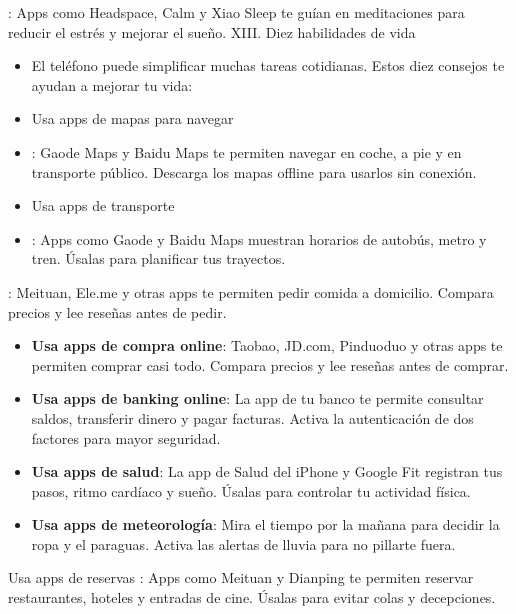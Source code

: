 \begin{tcbpractice}{: Apps como Headspace, Calm y Xiao Sleep te guían en meditaciones para reducir el estrés y mejorar el sueño.}
XIII. Diez habilidades de vida

\begin{itemize}
  \item El teléfono puede simplificar muchas tareas cotidianas. Estos diez consejos te ayudan a mejorar tu vida:
  \item Usa apps de mapas para navegar
  \item : Gaode Maps y Baidu Maps te permiten navegar en coche, a pie y en transporte público. Descarga los mapas offline para usarlos sin conexión.
  \item Usa apps de transporte
  \item : Apps como Gaode y Baidu Maps muestran horarios de autobús, metro y tren. Úsalas para planificar tus trayectos.
\end{itemize}

\end{tcbpractice}


: Meituan, Ele.me y otras apps te permiten pedir comida a domicilio. Compara precios y lee reseñas antes de pedir.

\begin{itemize}
  \item \textbf{Usa apps de compra online}: Taobao, JD.com, Pinduoduo y otras apps te permiten comprar casi todo. Compara precios y lee reseñas antes de comprar.
  \item \textbf{Usa apps de banking online}: La app de tu banco te permite consultar saldos, transferir dinero y pagar facturas. Activa la autenticación de dos factores para mayor seguridad.
  \item \textbf{Usa apps de salud}: La app de Salud del iPhone y Google Fit registran tus pasos, ritmo cardíaco y sueño. Úsalas para controlar tu actividad física.
  \item \textbf{Usa apps de meteorología}: Mira el tiempo por la mañana para decidir la ropa y el paraguas. Activa las alertas de lluvia para no pillarte fuera.
\end{itemize}

\begin{tcbinfo}{Usa apps de reservas}
: Apps como Meituan y Dianping te permiten reservar restaurantes, hoteles y entradas de cine. Úsalas para evitar colas y decepciones.

\end{tcbinfo}

